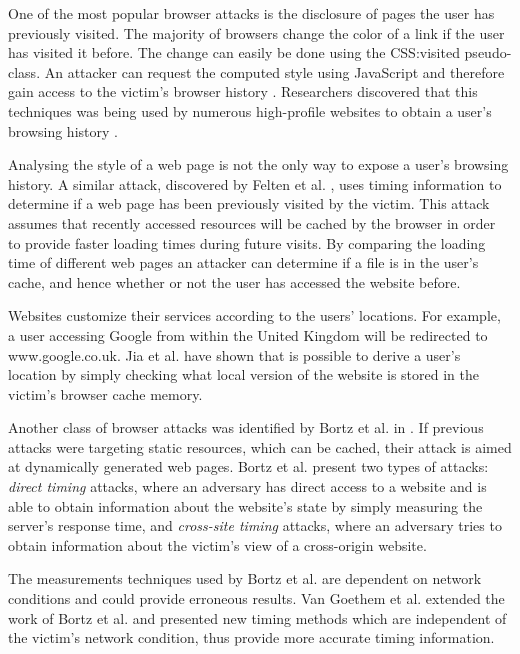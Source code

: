 \documentclass[10pt,a4paper,twoside]{book}
\begin{document}
One of the most popular browser attacks is the disclosure of pages the user has previously visited. The majority of browsers change the color of a link if the user has visited it before. The change can easily be done using the CSS:visited pseudo-class. An attacker can request the computed style using JavaScript and therefore gain access to the victim's browser history \cite{cssvisited}. Researchers discovered that this techniques was being used by numerous high-profile websites to obtain a user's browsing history
\cite{jang2010empirical}.

Analysing the style of a web page is not the only way to expose a user's browsing history. A similar attack, discovered by Felten et al. \cite{felten2000timing}, uses timing information to determine if a web page has been previously visited by the victim. This attack assumes that recently accessed resources will be cached by the browser in order to provide faster loading times during future visits. By comparing the loading time of different web pages an attacker can determine if a file is in the user’s cache, and hence whether or not the user has accessed the website before.

Websites customize their services according to the users’ locations. For example, a user accessing Google from within the United Kingdom will be redirected to www.google.co.uk. Jia et al. \cite{jia2015know} have shown that is possible to derive a user’s location by simply checking what local version of the website is stored in the victim's browser cache memory.

Another class of browser attacks was identified by Bortz et al. in \cite{bortz2007exposing}. If previous attacks were targeting static resources, which can be cached, their attack is aimed at dynamically generated web pages. Bortz et al. \cite{bortz2007exposing} present two types of attacks: \textit{direct timing} attacks, where an adversary has direct access to a website and is able to obtain information about the website's state by simply measuring the server's response time, and \textit{cross-site timing} attacks, where an adversary tries to obtain information about the victim's view of a cross-origin website.

The measurements techniques used by Bortz et al. \cite{bortz2007exposing} are dependent on network conditions and could provide erroneous results. Van Goethem et al.\cite{van2015clock} extended the work of Bortz et al. \cite{bortz2007exposing} and presented new timing methods which are independent of the victim's network condition, thus provide more accurate timing information. 
\end{document}
